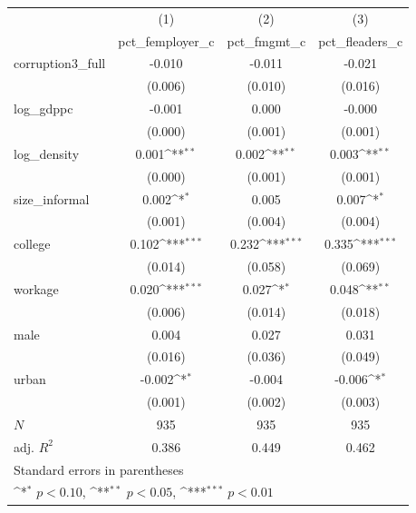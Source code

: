 {
\def\sym#1{\ifmmode^{#1}\else\(^{#1}\)\fi}
\begin{tabular}{l*{3}{c}}
\hline\hline
            &\multicolumn{1}{c}{(1)}&\multicolumn{1}{c}{(2)}&\multicolumn{1}{c}{(3)}\\
            &\multicolumn{1}{c}{pct\_femployer\_c}&\multicolumn{1}{c}{pct\_fmgmt\_c}&\multicolumn{1}{c}{pct\_fleaders\_c}\\
\hline
corruption3\_full&      -0.010         &      -0.011         &      -0.021         \\
            &     (0.006)         &     (0.010)         &     (0.016)         \\
[1em]
log\_gdppc   &      -0.001         &       0.000         &      -0.000         \\
            &     (0.000)         &     (0.001)         &     (0.001)         \\
[1em]
log\_density &       0.001\sym{**} &       0.002\sym{**} &       0.003\sym{**} \\
            &     (0.000)         &     (0.001)         &     (0.001)         \\
[1em]
size\_informal&       0.002\sym{*}  &       0.005         &       0.007\sym{*}  \\
            &     (0.001)         &     (0.004)         &     (0.004)         \\
[1em]
college     &       0.102\sym{***}&       0.232\sym{***}&       0.335\sym{***}\\
            &     (0.014)         &     (0.058)         &     (0.069)         \\
[1em]
workage     &       0.020\sym{***}&       0.027\sym{*}  &       0.048\sym{**} \\
            &     (0.006)         &     (0.014)         &     (0.018)         \\
[1em]
male        &       0.004         &       0.027         &       0.031         \\
            &     (0.016)         &     (0.036)         &     (0.049)         \\
[1em]
urban       &      -0.002\sym{*}  &      -0.004         &      -0.006\sym{*}  \\
            &     (0.001)         &     (0.002)         &     (0.003)         \\
\hline
\(N\)       &         935         &         935         &         935         \\
adj. \(R^{2}\)&       0.386         &       0.449         &       0.462         \\
\hline\hline
\multicolumn{4}{l}{\footnotesize Standard errors in parentheses}\\
\multicolumn{4}{l}{\footnotesize \sym{*} \(p<0.10\), \sym{**} \(p<0.05\), \sym{***} \(p<0.01\)}\\
\end{tabular}
}
